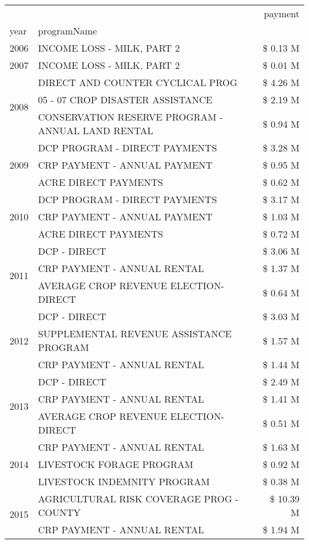 \begin{tabular}{llr}
\toprule
 &  & payment \\
year & programName &  \\
\midrule
2006 & INCOME LOSS - MILK, PART 2 & \$ 0.13 M \\
\cline{1-3}
2007 & INCOME LOSS - MILK, PART 2 & \$ 0.01 M \\
\cline{1-3}
\multirow[t]{3}{*}{2008} & DIRECT AND COUNTER CYCLICAL PROG & \$ 4.26 M \\
 & 05 - 07 CROP DISASTER ASSISTANCE & \$ 2.19 M \\
 & CONSERVATION RESERVE PROGRAM - ANNUAL LAND RENTAL & \$ 0.94 M \\
\cline{1-3}
\multirow[t]{3}{*}{2009} & DCP PROGRAM - DIRECT PAYMENTS & \$ 3.28 M \\
 & CRP PAYMENT - ANNUAL PAYMENT & \$ 0.95 M \\
 & ACRE DIRECT PAYMENTS & \$ 0.62 M \\
\cline{1-3}
\multirow[t]{3}{*}{2010} & DCP PROGRAM - DIRECT PAYMENTS & \$ 3.17 M \\
 & CRP PAYMENT - ANNUAL PAYMENT & \$ 1.03 M \\
 & ACRE DIRECT PAYMENTS & \$ 0.72 M \\
\cline{1-3}
\multirow[t]{3}{*}{2011} & DCP - DIRECT & \$ 3.06 M \\
 & CRP PAYMENT - ANNUAL RENTAL & \$ 1.37 M \\
 & AVERAGE CROP REVENUE ELECTION-DIRECT & \$ 0.64 M \\
\cline{1-3}
\multirow[t]{3}{*}{2012} & DCP - DIRECT & \$ 3.03 M \\
 & SUPPLEMENTAL REVENUE ASSISTANCE PROGRAM & \$ 1.57 M \\
 & CRP PAYMENT - ANNUAL RENTAL & \$ 1.44 M \\
\cline{1-3}
\multirow[t]{3}{*}{2013} & DCP - DIRECT & \$ 2.49 M \\
 & CRP PAYMENT - ANNUAL RENTAL & \$ 1.41 M \\
 & AVERAGE CROP REVENUE ELECTION-DIRECT & \$ 0.51 M \\
\cline{1-3}
\multirow[t]{3}{*}{2014} & CRP PAYMENT - ANNUAL RENTAL & \$ 1.63 M \\
 & LIVESTOCK FORAGE PROGRAM & \$ 0.92 M \\
 & LIVESTOCK INDEMNITY PROGRAM & \$ 0.38 M \\
\cline{1-3}
\multirow[t]{3}{*}{2015} & AGRICULTURAL RISK COVERAGE PROG - COUNTY & \$ 10.39 M \\
 & CRP PAYMENT - ANNUAL RENTAL & \$ 1.94 M \\

\end{tabular}
